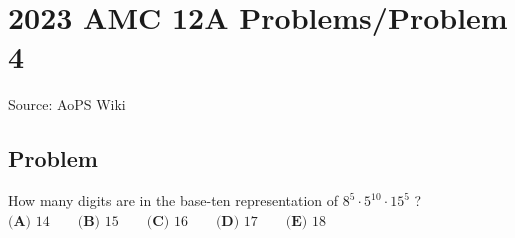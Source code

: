 \documentclass[12pt]{article}
\begin{document}
\section*{{2023 AMC 12A Problems/Problem 4}}
Source: AoPS Wiki

\subsection*{Problem}
How many digits are in the base-ten representation of $8^5 \cdot 5^{10} \cdot 15^5$ ? $\textbf{(A) } 14 \qquad\textbf{(B) }15 \qquad\textbf{(C) }16 \qquad\textbf{(D) }17 \qquad\textbf{(E) } 18$
\end{document}
